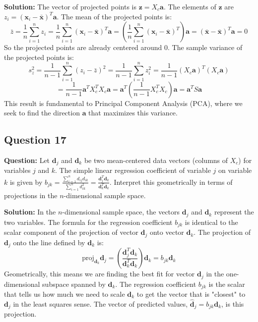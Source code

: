 \textbf{Solution:}
The vector of projected points is $\mathbf{z} = X_c \mathbf{a}$. The elements of $\mathbf{z}$ are $z_i = (\mathbf{x}_i - \bar{\mathbf{x}})^T \mathbf{a}$.
The mean of the projected points is:
$$ \bar{z} = \frac{1}{n} \sum_{i=1}^n z_i = \frac{1}{n} \sum_{i=1}^n (\mathbf{x}_i - \bar{\mathbf{x}})^T \mathbf{a} = \left( \frac{1}{n} \sum_{i=1}^n (\mathbf{x}_i - \bar{\mathbf{x}})^T \right) \mathbf{a} = (\bar{\mathbf{x}} - \bar{\mathbf{x}})^T \mathbf{a} = 0 $$
So the projected points are already centered around 0.
The sample variance of the projected points is:
$$ s_z^2 = \frac{1}{n-1} \sum_{i=1}^n (z_i - \bar{z})^2 = \frac{1}{n-1} \sum_{i=1}^n z_i^2 = \frac{1}{n-1} (X_c \mathbf{a})^T (X_c \mathbf{a}) $$
$$ = \frac{1}{n-1} \mathbf{a}^T X_c^T X_c \mathbf{a} = \mathbf{a}^T \left( \frac{1}{n-1} X_c^T X_c \right) \mathbf{a} = \mathbf{a}^T S \mathbf{a} $$
This result is fundamental to Principal Component Analysis (PCA), where we seek to find the direction $\mathbf{a}$ that maximizes this variance.

\subsection*{Question 17}
\textbf{Question:} Let $\mathbf{d}_j$ and $\mathbf{d}_k$ be two mean-centered data vectors (columns of $X_c$) for variables $j$ and $k$. The simple linear regression coefficient of variable $j$ on variable $k$ is given by $b_{jk} = \frac{\sum_{i=1}^n d_{ij}d_{ik}}{\sum_{i=1}^n d_{ik}^2} = \frac{\mathbf{d}_j^T \mathbf{d}_k}{\mathbf{d}_k^T \mathbf{d}_k}$. Interpret this geometrically in terms of projections in the $n$-dimensional sample space.

\textbf{Solution:}
In the $n$-dimensional sample space, the vectors $\mathbf{d}_j$ and $\mathbf{d}_k$ represent the two variables. The formula for the regression coefficient $b_{jk}$ is identical to the scalar component of the projection of vector $\mathbf{d}_j$ onto vector $\mathbf{d}_k$.
The projection of $\mathbf{d}_j$ onto the line defined by $\mathbf{d}_k$ is:
$$ \text{proj}_{\mathbf{d}_k} \mathbf{d}_j = \left( \frac{\mathbf{d}_j^T \mathbf{d}_k}{\mathbf{d}_k^T \mathbf{d}_k} \right) \mathbf{d}_k = b_{jk} \mathbf{d}_k $$
Geometrically, this means we are finding the best fit for vector $\mathbf{d}_j$ in the one-dimensional subspace spanned by $\mathbf{d}_k$. The regression coefficient $b_{jk}$ is the scalar that tells us how much we need to scale $\mathbf{d}_k$ to get the vector that is "closest" to $\mathbf{d}_j$ in the least squares sense. The vector of predicted values, $\hat{\mathbf{d}}_j = b_{jk}\mathbf{d}_k$, is this projection.


